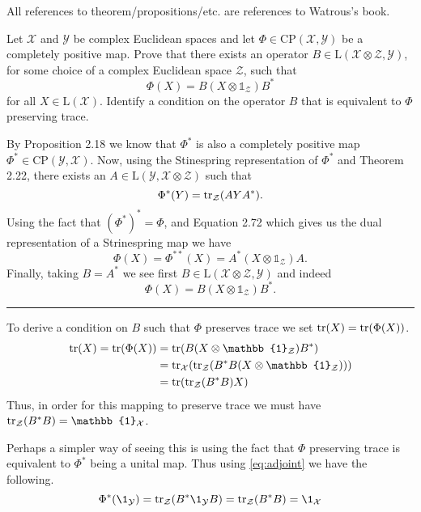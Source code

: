 \documentclass[boxes,pages,color=SeaGreen]{homework}
\newcommand{\I}{\mathbb{1}}
\newcommand{\X}{\mathcal{X}}
\newcommand{\Y}{\mathcal{Y}}
\newcommand{\Z}{\mathcal{Z}}
\newcommand{\Lin}{\mathrm{L}}
\newcommand{\CP}{\mathrm{CP}}
\begin{document}
All references to theorem/propositions/etc. are references to Watrous's book.

\begin{problem}
Let $\X$ and $\Y$ be complex Euclidean spaces and let
$\Phi\in\CP(\X,\Y)$ be a completely positive map.
Prove that there exists an operator $B\in\Lin(\X\otimes\Z,\Y)$, for some
choice of a complex Euclidean space $\Z$, such that
\[
    \Phi(X) = B (X \otimes \I_{\Z}) B^{\ast}
\]
for all $X\in\Lin(\X)$.
Identify a condition on the operator $B$ that is equivalent to $\Phi$
preserving trace.
\end{problem}

\begin{solution}
    By Proposition 2.18 we know that $\Phi^*$ is also a completely positive map $\Phi^*\in\CP(\Y, \X)$.
    Now, using the Stinespring representation of $\Phi^*$ and Theorem 2.22, there exists an $A\in \Lin(\Y, \X\otimes\Z)$ such that
    \begin{equation}\label{eq:adjoint}
        \Phi^*(Y) = \tr_\Z(AYA^*).
    \end{equation}
    Using the fact that $(\Phi^*)^* = \Phi$, and Equation 2.72 which gives us the dual representation of a Strinespring map we have
    \begin{equation*}
        \Phi(X) = \Phi^{**}(X) = A^*(X\otimes\I_\Z)A.
    \end{equation*}
    Finally, taking $B = A^*$ we see first $B\in\Lin(\X\otimes\Z, \Y)$ and indeed
    \begin{equation*}
        \Phi(X) = B (X \otimes \I_{\Z}) B^*.
    \end{equation*}
    {\color{SeaGreen}\rule{\textwidth}{.5pt}}

    \noindent
    To derive a condition on $B$ such that $\Phi$ preserves trace we set $\tr(X) = \tr(\Phi(X))$.
    \begin{align*}
        \tr(X) = \tr(\Phi(X)) & = \tr(B(X\otimes\I_\Z)B^*)            \\
                              & = \tr_\X(\tr_\Z(B^*B(X\otimes\I_\Z))) \\
                              & = \tr(\tr_\Z(B^*B)X)
    \end{align*}
    Thus, in order for this mapping to preserve trace we must have $\tr_\Z(B^*B) = \I_\X$.

    Perhaps a simpler way of seeing this is using the fact that $\Phi$ preserving trace is equivalent to $\Phi^*$ being a unital map.
    Thus using \cref{eq:adjoint} we have the following.
    \begin{equation*}
        \Phi^*(\1_\Y) = \tr_\Z(B^*\1_\Y B) = \tr_\Z(B^* B) = \1_\X
    \end{equation*}
\end{solution}
\end{document}
